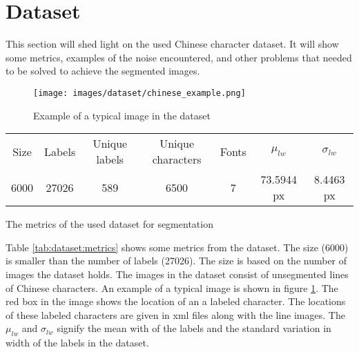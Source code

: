 \newpage
\section{Dataset} %
\label{sec:dataset}

This section will shed light on the used Chinese character dataset. It will show some metrics, examples of the noise encountered, and other problems that needed to be solved to achieve the segmented images.

\begin{figure}[ht]
 \centering
\texttt{[image: images/dataset/chinese\_example.png]}
 \caption{Example of a typical image in the dataset}
 \label{fig:dataset:chinese:example}
\end{figure}

\bigskip

\begin{minipage}{\linewidth}
\flushleft
{} \label{tab:dataset:metrics} 
\begin{tabular}{ c c c c c c c}
\hline
\hline
Size		& Labels 	& Unique labels	& Unique characters	& Fonts & $\mu_{lw}$ & $\sigma_{lw}$\\
6000 		& 27026				  & 589						  & 6500					& 7       & 73.5944 px   & 8.4463 px\\
\hline
\end{tabular}\par
\bigskip
The metrics of the used dataset for segmentation
\end{minipage}

\bigskip

\noindent Table \ref{tab:dataset:metrics} shows some metrics from the dataset. The size (6000) is smaller than the number of labels (27026). The size is based on the number of images the dataset holds. The images in the dataset consist of unsegmented lines of Chinese characters. An example of a typical image is shown in figure \ref{fig:dataset:chinese:example}. The red box in the image shows the location of an a labeled character. The locations of these labeled characters are given in xml files along with the line images. The $\mu_{lw}$ and $\sigma_{lw}$ signify the mean with of the labels and the standard variation in width of the labels in the dataset.

